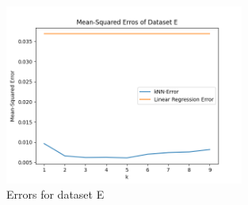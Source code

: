 \documentclass[10pt,letter,notitlepage]{article}
\newcounter{exercise}
\begin{document}
\begin{exercise}
\begin{enumerate}
{      \begin{figure}[H]
      \centering
      \includegraphics[width=0.7\textwidth]{Exercise4_dataset_E_error.png}
      \caption{Errors for dataset E}
      \end{figure}
      
}
\end{enumerate}
\end{exercise}
\end{document}

